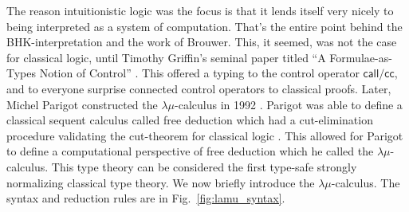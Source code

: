The reason intuitionistic logic was the focus is that it lends itself
very nicely to being interpreted as a system of computation.  That's
the entire point behind the BHK-interpretation and the work of
Brouwer.  This, it seemed, was not the case for classical logic, until
Timothy Griffin's seminal paper titled ``A Formulae-as-Types Notion of
Control'' \cite{Griffin:1990}.  This offered a typing to the control
operator $\mathsf{call/cc}$, and to everyone surprise
connected control operators to classical
proofs. Later, Michel Parigot constructed the $\lambda\mu$-calculus in
1992 \cite{Parigot:1992}.  Parigot was able to define a classical
sequent calculus called free deduction which had a cut-elimination
procedure validating the cut-theorem for classical logic
\cite{Parigot:1992b}.  This allowed for Parigot to define a
computational perspective of free deduction which he called the
$\lambda\mu$-calculus.  This type theory can be considered the first
type-safe strongly normalizing classical type theory. We now briefly
introduce the $\lambda\mu$-calculus.  The syntax and reduction rules
are in Fig.~\ref{fig:lamu_syntax}.

